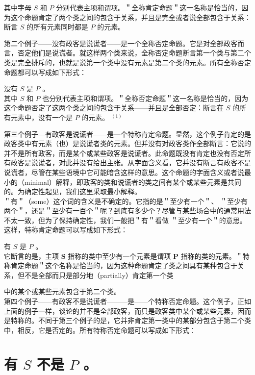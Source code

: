 其中字母 $S$ 和 $P$ 分别代表主项和谓项。＂全称肯定命题＂这一名称是恰当的，因为这个命题肯定了两个类之间的包含于关系，并且是完全或者说全部包含于关系：断言 $S$ 的所有元素同时都是 $P$ 的元素。

第二个例子——没有政客是说谎者——是一个全称否定命题。它是对全部政客而言，否定他们是说谎者。就这样两个类来说，全称否定命题断言第一个类与第二个类是完全排斥的，也就是说第一个类中没有元素是第二个类的元素。所有全称否定命题都可以写成如下形式：

没有 $S$ 是 $P$ 。\\
其中 $S$ 和 $P$ 也分别代表主项和谓项。＂全称否定命题＂这一名称是恰当的，因为这个命题否定了这两个类之间的包含于关系——并且是全部否定：断言在 $S$ 的所有元素中，没有一个是 $P$ 的元素。 ${ }^{(1)}$

第三个例子—有政客是说谎者——是一个特称肯定命题。显然，这个例子肯定的是政客类中有元素（也）是说谎者类的元素。但并没有对政客类作全部断言：它说的并不是所有政客，而是某个或某些政客是说谎者。此命题既没有肯定也没有否定所有政客是说谎者，对此并没有给出主张。从字面含义看，它并没有断言有政客不是说谎者，尽管在某些语境中它可能暗含这样的意思。这个命题的字面含义或者说最小的（minimal）解释，即政客的类和说谎者的类之间有某个或某些元素是共同的。为确定性起见，我们这里采取最小解释。\\
＂有＂（some）这个词的含义是不确定的。它指的是＂至少有一个＂、 ＂至少有两个＂，还是＂至少有一百个＂呢？到底有多少个？尽管与某些场合中的通常用法不太一致，但为了保持确定性，我们一般把＂有＂看做 ＂至少有一个＂的意思。这样，特称肯定命题可以写成如下形式：

有 $S$ 是 $P$ 。\\
它断言的是，主项 $\boldsymbol{S}$ 指称的类中至少有一个元素是谓项 $\boldsymbol{P}$ 指称的类的元素。＂特称肯定命题＂这个名称是恰当的，因为这种命题肯定了类之间具有某种包含于关系，但不是全部而只是部分地（partially）肯定第一个类

中的某个或某些元素包含于第二个类。\\
第四个例子——有政客不是说谎者———是——个特称否定命题。这个例子，正如上面的例子一样，谈论的并不是全部政客，而只是政客类中某个或某些元素，因而是特称的。不同于第三个例子的是，它并非肯定第一类中的某部分包含于第二个类中，相反，它是否定的。所有特称否定命题可以写成如下形式：

\section*{有 $S$ 不是 $P$ 。}

